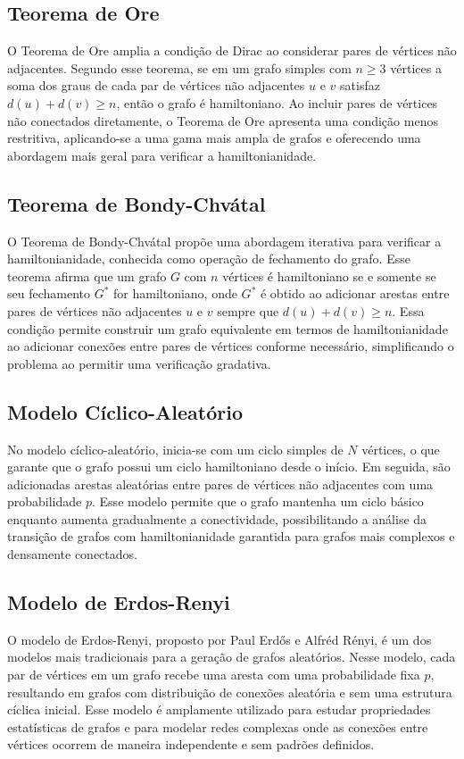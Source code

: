 \documentclass[12pt, openright, oneside, a4paper, chapter=TITLE, section=TITLE, subsection=TITLE, subsubsection=TITLE, brazil]{abntex2}
\begin{document}
\subsection{Teorema de Ore}
\hspace{1.25cm}O Teorema de Ore amplia a condição de Dirac ao considerar pares de vértices não adjacentes. Segundo esse teorema, se em um grafo simples com $n \geq 3$ vértices a soma dos graus de cada par de vértices não adjacentes $u$ e $v$ satisfaz $d(u) + d(v) \geq n$, então o grafo é hamiltoniano. Ao incluir pares de vértices não conectados diretamente, o Teorema de Ore apresenta uma condição menos restritiva, aplicando-se a uma gama mais ampla de grafos e oferecendo uma abordagem mais geral para verificar a hamiltonianidade.

\subsection{Teorema de Bondy-Chvátal}
\hspace{1.25cm}O Teorema de Bondy-Chvátal propõe uma abordagem iterativa para verificar a hamiltonianidade, conhecida como operação de fechamento do grafo. Esse teorema afirma que um grafo $G$ com $n$ vértices é hamiltoniano se e somente se seu fechamento $G^{*}$ for hamiltoniano, onde $G^{*}$ é obtido ao adicionar arestas entre pares de vértices não adjacentes $u$ e $v$ sempre que $d(u) + d(v) \geq n$. Essa condição permite construir um grafo equivalente em termos de hamiltonianidade ao adicionar conexões entre pares de vértices conforme necessário, simplificando o problema ao permitir uma verificação gradativa.

\subsection{Modelo Cíclico-Aleatório}
\hspace{1.25cm}No modelo cíclico-aleatório, inicia-se com um ciclo simples de $N$ vértices, o que garante que o grafo possui um ciclo hamiltoniano desde o início. Em seguida, são adicionadas arestas aleatórias entre pares de vértices não adjacentes com uma probabilidade $p$. Esse modelo permite que o grafo mantenha um ciclo básico enquanto aumenta gradualmente a conectividade, possibilitando a análise da transição de grafos com hamiltonianidade garantida para grafos mais complexos e densamente conectados.

\subsection{Modelo de Erdos-Renyi}
\hspace{1.25cm}O modelo de Erdos-Renyi, proposto por Paul Erdős e Alfréd Rényi, é um dos modelos mais tradicionais para a geração de grafos aleatórios. Nesse modelo, cada par de vértices em um grafo recebe uma aresta com uma probabilidade fixa $p$, resultando em grafos com distribuição de conexões aleatória e sem uma estrutura cíclica inicial. Esse modelo é amplamente utilizado para estudar propriedades estatísticas de grafos e para modelar redes complexas onde as conexões entre vértices ocorrem de maneira independente e sem padrões definidos.
\end{document}
